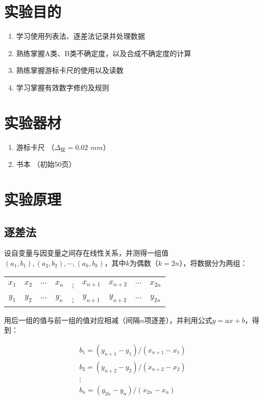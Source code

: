 \documentclass{jiwu}
\begin{document}
\maketitle
\thispagestyle{firstpage}
\section{实验目的}
\begin{enumerate}
    \item 学习使用列表法、逐差法记录并处理数据
    \item 熟练掌握A类、B类不确定度，以及合成不确定度的计算
    \item 熟练掌握游标卡尺的使用以及读数
    \item 学习掌握有效数字修约及规则
\end{enumerate}
\section{实验器材}
\begin{enumerate}
    \item 游标卡尺 （$\Delta_{仪}=0.02\,\,mm$）
    \item 书本 （初始50页）
\end{enumerate}
\section{实验原理}
    \subsection{逐差法}
    设自变量与因变量之间存在线性关系，并测得一组值 $(a_1,b_1),(a_2,b_2),\cdots,(a_k,b_k)$，其中$k$为偶数（$k=2n$），将数据分为两组：
    
    \begin{tabular}{ccccccccc}
        $x_1$&$x_2$&$\cdots$&$x_n$&;&$x_{n+1}$&$x_{n+2}$&$\cdots$&$x_{2n}$\\
        $y_1$&$y_2$&$\cdots$&$y_n$&;&$y_{n+1}$&$y_{n+2}$&$\cdots$&$y_{2n}$\\
    \end{tabular}

    用后一组的值与前一组的值对应相减（间隔$n$项逐差），并利用公式$y=ax+b$，得到：

    $$
        \begin{array}{l}
            b_1=(y_{n+1}-y_1)/(x_{n+1}-x_1)\\
            b_2=(y_{n+2}-y_2)/(x_{n+2}-x_2)\\
            \vdots\\
            b_n=(y_{2n}-y_n)/(x_{2n}-x_n)
        \end{array}
    $$\par
\end{document}
